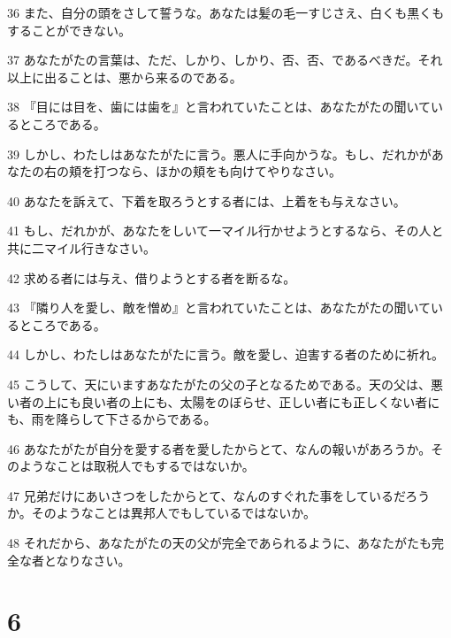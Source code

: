 \par 36 また、自分の頭をさして誓うな。あなたは髪の毛一すじさえ、白くも黒くもすることができない。
\par 37 あなたがたの言葉は、ただ、しかり、しかり、否、否、であるべきだ。それ以上に出ることは、悪から来るのである。
\par 38 『目には目を、歯には歯を』と言われていたことは、あなたがたの聞いているところである。
\par 39 しかし、わたしはあなたがたに言う。悪人に手向かうな。もし、だれかがあなたの右の頬を打つなら、ほかの頬をも向けてやりなさい。
\par 40 あなたを訴えて、下着を取ろうとする者には、上着をも与えなさい。
\par 41 もし、だれかが、あなたをしいて一マイル行かせようとするなら、その人と共に二マイル行きなさい。
\par 42 求める者には与え、借りようとする者を断るな。
\par 43 『隣り人を愛し、敵を憎め』と言われていたことは、あなたがたの聞いているところである。
\par 44 しかし、わたしはあなたがたに言う。敵を愛し、迫害する者のために祈れ。
\par 45 こうして、天にいますあなたがたの父の子となるためである。天の父は、悪い者の上にも良い者の上にも、太陽をのぼらせ、正しい者にも正しくない者にも、雨を降らして下さるからである。
\par 46 あなたがたが自分を愛する者を愛したからとて、なんの報いがあろうか。そのようなことは取税人でもするではないか。
\par 47 兄弟だけにあいさつをしたからとて、なんのすぐれた事をしているだろうか。そのようなことは異邦人でもしているではないか。
\par 48 それだから、あなたがたの天の父が完全であられるように、あなたがたも完全な者となりなさい。

\chapter{6}

